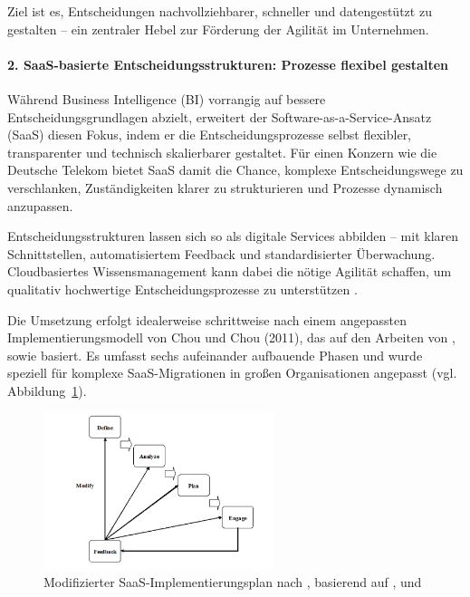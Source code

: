 \documentclass[12pt,a4paper]{article}
\begin{document}
\noindent Ziel ist es, Entscheidungen nachvollziehbarer, schneller und datengestützt zu gestalten – ein zentraler Hebel zur Förderung der Agilität im Unternehmen.
\paragraph{2. SaaS-basierte Entscheidungsstrukturen: Prozesse flexibel gestalten}

Während Business Intelligence (BI) vorrangig auf bessere Entscheidungsgrundlagen abzielt, erweitert der Software-as-a-Service-Ansatz (SaaS) diesen Fokus, indem er die Entscheidungsprozesse selbst flexibler, transparenter und technisch skalierbarer gestaltet. Für einen Konzern wie die Deutsche Telekom bietet SaaS damit die Chance, komplexe Entscheidungswege zu verschlanken, Zuständigkeiten klarer zu strukturieren und Prozesse dynamisch anzupassen.

\noindent Entscheidungsstrukturen lassen sich so als digitale Services abbilden – mit klaren Schnittstellen, automatisiertem Feedback und standardisierter Überwachung. Cloudbasiertes Wissensmanagement kann dabei die nötige Agilität schaffen, um qualitativ hochwertige Entscheidungsprozesse zu unterstützen \parencite{churakova2010software}.


\noindent Die Umsetzung erfolgt idealerweise schrittweise nach einem angepassten Implementierungsmodell von Chou und Chou (2011), das auf den Arbeiten von \parencite{murthy2010tapping}, \parencite{chong2006multi} sowie \parencite{buyya2008market} basiert. Es umfasst sechs aufeinander aufbauende Phasen und wurde speziell für komplexe SaaS-Migrationen in großen Organisationen angepasst (vgl. Abbildung~\ref{fig:saas-implementation-plan}).



\begin{figure}[H]
	\centering
	\includegraphics[width=0.6\textwidth]{./images/saas_implementation_plan.png}
\caption{Modifizierter SaaS-Implementierungsplan nach \textcite{chou2011cloud}, basierend auf \textcite{murthy2010tapping}, \textcite{chong2006multi} und \textcite{buyya2008market}}
	\label{fig:saas-implementation-plan}
\end{figure}
\end{document}
